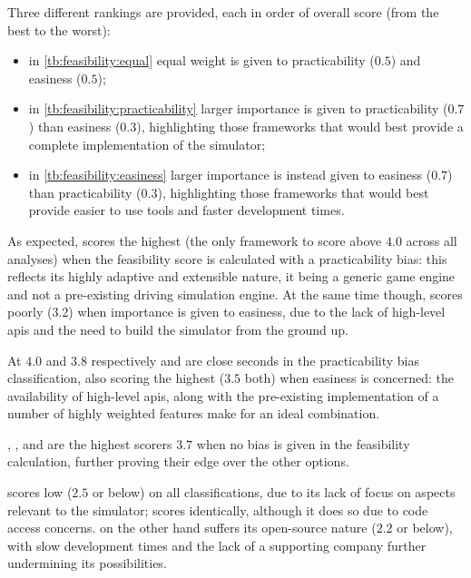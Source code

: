 Three different rankings are provided, each in order of overall score (from the best to the worst):

\begin{itemize}
	\item in \cref{tb:feasibility:equal} equal weight is given to \gls{practicability} ($0.5$) and \gls{easiness} ($0.5$);
    \item in \cref{tb:feasibility:practicability} larger importance is given to \gls{practicability} ($0.7$) than \gls{easiness} ($0.3$), highlighting those \glspl{framework} that would best provide a complete implementation of the simulator;
    \item in \cref{tb:feasibility:easiness} larger importance is instead given to \gls{easiness} ($0.7$) than \gls{practicability} ($0.3$), highlighting those \glspl{framework} that would best provide easier to use tools and faster development times.
\end{itemize}



As expected,  scores the highest (the only \gls{framework} to score above $4.0$ across all analyses) when the \gls{feasibility} score is calculated with a \gls{practicability} bias: this reflects its highly adaptive and extensible nature, it being a generic game engine and not a pre-existing driving simulation engine. At the same time though,  scores poorly ($3.2$) when importance is given to easiness, due to the lack of high-level \glspl{api} and the need to build the simulator from the ground up.

At $4.0$ and $3.8$ respectively  and  are close seconds in the \gls{practicability} bias classification, also scoring the highest ($3.5$ both) when \gls{easiness} is concerned: the availability of high-level \glspl{api}, along with the pre-existing implementation of a number of highly weighted \glspl{feature} make for an ideal combination.

, , and  are the highest scorers $3.7$ when no bias is given in the \gls{feasibility} calculation, further proving their edge over the other options.

 scores low ($2.5$ or below) on all classifications, due to its lack of focus on aspects relevant to the simulator;  scores identically, although it does so due to code access concerns.  on the other hand suffers its open-source nature ($2.2$ or below), with slow development times and the lack of a supporting company further undermining its possibilities.

